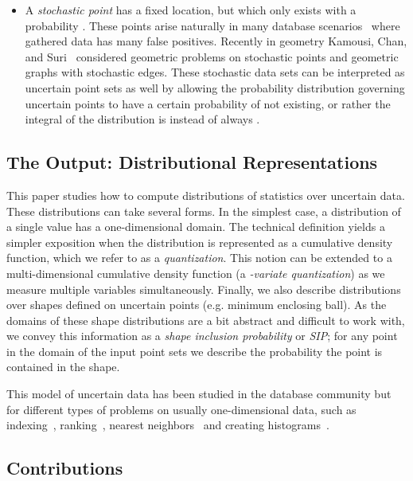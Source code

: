 \documentclass{journal}
\begin{document}
\begin{itemize}
\item 
A \emph{stochastic point}  has a fixed location, but which only exists with a probability .  These points arise naturally in many database scenarios~\cite{ABSHNSW06,CLY09} where gathered data has many false positives. Recently in geometry Kamousi, Chan, and Suri~\cite{KCS11a,KCS11b} considered geometric problems on stochastic points and geometric graphs with stochastic edges.  
These stochastic data sets can be interpreted as uncertain point sets as well by allowing the probability distribution governing uncertain points to have a certain probability of not existing, or rather the integral of the distribution is  instead of always .  

\end{itemize}


\subsection {The Output: Distributional Representations}

This paper studies how to compute distributions of statistics over uncertain data.  
These distributions can take several forms.  In the simplest case, a distribution of a single value has a one-dimensional domain.  
The technical definition yields a simpler exposition when the distribution is represented as a cumulative density function, which we refer to as a \emph{quantization}.  
This notion can be extended to a multi-dimensional cumulative density function (a \emph{-variate quantization}) as we measure multiple variables simultaneously.  Finally, we also describe distributions over shapes defined on uncertain points (e.g. minimum enclosing ball).  As the domains of these shape distributions are a bit abstract and difficult to work with, we convey this information as a \emph{shape inclusion probability} or \emph{SIP}; for any point in the domain of the input point sets we describe the probability the point is contained in the shape.  

This model of uncertain data has been studied in the database community but for different types of problems on usually one-dimensional data, such as indexing~\cite{ACTY09,TCXNKP05,KMMH06}, ranking~\cite{CLY09}, nearest neighbors~\cite{CCMC08} and creating histograms~\cite{CG09}.


\subsection{Contributions}
\end{document}

